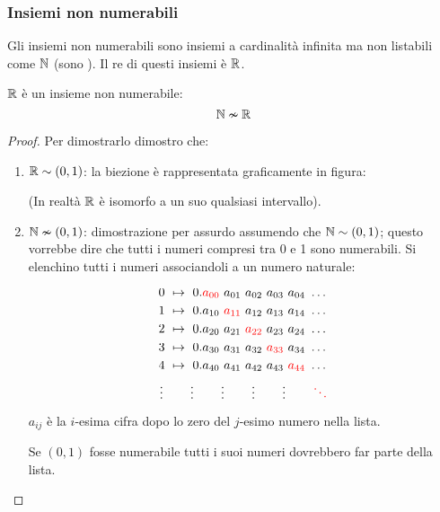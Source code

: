 \subsubsection{Insiemi non numerabili}
Gli insiemi non numerabili sono insiemi a cardinalità infinita ma non listabili come
$\mathbb{N}$ (sono ). Il re di questi insiemi è $\mathbb{R}$.

\begin{theorem}
    $\mathbb{R}$ è un insieme non numerabile: $$ \mathbb{N} \nsim \mathbb{R} $$
\end{theorem}
\begin{proof} Per dimostrarlo dimostro che:
    \begin{enumerate}
        \item $\mathbb{R} \sim (0,1)$: la biezione è rappresentata graficamente in figura:
            \vspace{-.2cm}
            \begin{figure}[H]
                \centering
                
            \end{figure}\vspace{-.6cm}
            (In realtà $\mathbb{R}$ è isomorfo a un suo qualsiasi intervallo).
        \item $\mathbb{N} \nsim (0,1)$: dimostrazione per assurdo assumendo che $\mathbb{N} \sim (0,1)$;
            questo vorrebbe dire che tutti i numeri compresi tra 0 e 1 sono numerabili.
            Si elenchino tutti i numeri associandoli a un numero naturale:

            \begin{minipage}{.45\textwidth}
                $$0\ \mapsto \ 0.{\color{red}a_{00}}\ a_{01}\ a_{02}\ a_{03}\ a_{04}\ \dots$$
                $$1\ \mapsto \ 0.a_{10}\ {\color{red}a_{11}}\ a_{12}\ a_{13}\ a_{14}\ \dots$$
                $$2\ \mapsto \ 0.a_{20}\ a_{21}\ {\color{red}a_{22}}\ a_{23}\ a_{24}\ \dots$$
                $$3\ \mapsto \ 0.a_{30}\ a_{31}\ a_{32}\ {\color{red}a_{33}}\ a_{34}\ \dots$$
                $$4\ \mapsto \ 0.a_{40}\ a_{41}\ a_{42}\ a_{43}\ {\color{red}a_{44}}\ \dots$$
                $$\vdots\qquad\vdots\qquad\vdots\qquad\vdots\qquad\vdots\qquad{\color{red}\ddots}$$
                \vspace{.4cm}
            \end{minipage}
            \begin{minipage}{.48\textwidth}
                $a_{ij}$ è la $i$-esima cifra dopo lo zero del $j$-esimo numero
                nella lista.

                Se $(0,1)$ fosse numerabile tutti i suoi numeri dovrebbero far parte
                della lista.


\end{minipage}
\end{enumerate}
\end{proof}
